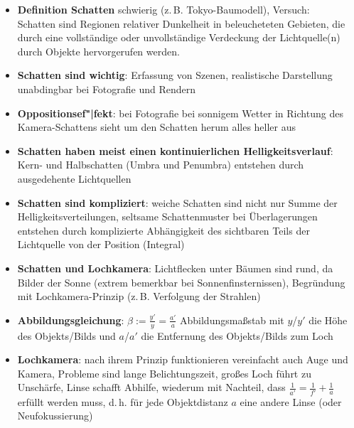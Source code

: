\begin{itemize}
    \item
    \textbf{Definition Schatten} schwierig (z.\,B. Tokyo-Baumodell),
    Versuch: \\
    Schatten sind Regionen relativer Dunkelheit in beleucheteten Gebieten,
    die durch eine vollständige oder unvollständige Verdeckung der
    Lichtquelle(n) durch Objekte hervorgerufen werden.

    \item
    \textbf{Schatten sind wichtig}: Erfassung von Szenen, realistische
    Darstellung unabdingbar bei Fotografie und Rendern

    \item
    \textbf{Oppositionsef"|fekt}:
    bei Fotografie bei sonnigem Wetter in Richtung des Kamera-Schat\-tens
    sieht um den Schatten herum alles heller aus

    \item
    \textbf{Schatten haben meist einen kontinuierlichen Helligkeitsverlauf}:
    Kern- und Halbschatten (Umbra und Penumbra)
    entstehen durch ausgedehente Lichtquellen

    \item
    \textbf{Schatten sind kompliziert}:
    weiche Schatten sind nicht nur Summe der Helligkeitsverteilungen,
    seltsame Schattenmuster bei Überlagerungen entstehen durch komplizierte
    Abhängigkeit des sichtbaren Teils der Lichtquelle von der Position
    (Integral)

    \item
    \textbf{Schatten und Lochkamera}:
    Lichtflecken unter Bäumen sind rund, da Bilder der Sonne
    (extrem bemerkbar bei Sonnenfinsternissen), Begründung mit
    Lochkamera-Prinzip (z.\,B. Verfolgung der Strahlen)

    \item
    \textbf{Abbildungsgleichung}: $\beta := \frac{y'}{y} = \frac{a'}{a}$
    Abbildungsmaßstab mit
    $y$/$y'$ die Höhe des Objekts/Bilds und
    $a$/$a'$ die Entfernung des Objekts/Bilds zum Loch

    \item
    \textbf{Lochkamera}:
    nach ihrem Prinzip funktionieren vereinfacht auch Auge und Kamera,
    Probleme sind lange Belichtungszeit, großes Loch führt zu Unschärfe,
    Linse schafft Abhilfe, wiederum mit Nachteil, dass
    $\frac{1}{a'} = \frac{1}{f'} + \frac{1}{a}$ erfüllt werden muss, d.\,h.
    für jede Objektdistanz $a$ eine andere Linse (oder Neufokussierung)
\end{itemize}
